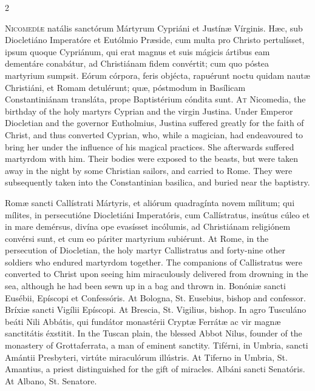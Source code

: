 \begin{paracol}{2}
\begin{roman}
		\lettrine[lines=2]{N}{icomedíæ} natális sanctórum Mártyrum Cypriáni et
		Justínæ Vírginis. Hæc, sub Diocletiáno Imperatóre et Eutólmio Præside,
		cum multa pro Christo pertulísset, ipsum quoque Cypriánum, qui erat
		magnus et suis mágicis ártibus eam dementáre conabátur, ad Christiánam
		fidem convértit; cum quo póstea martyrium sumpsit. Eórum córpora, feris
		objécta, rapuérunt noctu quidam nautæ Christiáni, et Romam detulérunt;
		quæ, póstmodum in Basílicam Constantiniánam transláta, prope
		Baptistérium cóndita sunt.
		\switchcolumn
		\lettrine[lines=2]{A}{t} Nicomedia, the birthday of the holy martyrs
		Cyprian and the virgin Justina. Under Emperor Diocletian and the
		governor Eutholmius, Justina suffered greatly for the faith of Christ,
		and thus converted Cyprian, who, while a magician, had endeavoured to
		bring her under the influence of his magical practices. She afterwards
		suffered martyrdom with him. Their bodies were exposed to the beasts,
		but were taken away in the night by some Christian sailors, and carried
		to Rome. They were subsequently taken into the Constantinian basilica,
		and buried near the baptistry.
		\switchcolumn*

	\end{roman}

Romæ sancti Callístrati 
 Mártyris, et aliórum quadragínta novem mílitum; qui mílites, in persecutióne 
 Diocletiáni Imperatóris, cum Callístratus, insútus cúleo et in mare demérsus, 
 divína ope evasísset incólumis, ad Christiánam religiónem convérsi sunt, et 
 cum eo páriter martyrium subiérunt.
\switchcolumn
{}
At Rome, in the persecution of 
 Diocletian, the holy martyr Callistratus and forty-nine other soldiers who 
 endured martyrdom together. The companions of Callistratus were 
 converted to Christ upon seeing him miraculously delivered from drowning in 
 the sea, although he had been sewn up in a bag and thrown in.
\switchcolumn*
{}
Bonóniæ sancti Eusébii, 
 Epíscopi et Confessóris.
\switchcolumn
{}
At Bologna, St. Eusebius, bishop and 
 confessor.
\switchcolumn*
{}
Bríxiæ sancti Vigílii 
 Epíscopi.
\switchcolumn
{}
At Brescia, St. Vigilius, bishop.
\switchcolumn*
{}
In agro Tusculáno beáti 
 Nili Abbátis, qui fundátor monastérii Cryptæ Ferrátæ ac vir magnæ sanctitátis 
 éxstitit.
\switchcolumn
{}
In the Tuscan plain, the blessed 
 Abbot Nilus, founder of the monastery of Grottaferrata, a man of eminent 
 sanctity.
\switchcolumn*
{}
Tiférni, in Umbria, 
 sancti Amántii Presbyteri, virtúte miraculórum illústris.
\switchcolumn
{}
At Tiferno in Umbria, St. Amantius, 
 a priest distinguished for the gift of miracles.
\switchcolumn*
{}
Albáni sancti Senatóris.
\switchcolumn
{}
At Albano, St. Senatore.
\switchcolumn*
{}
\end{paracol}


